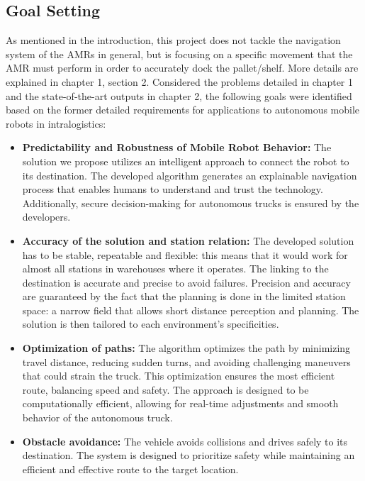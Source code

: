 \subsection{Goal Setting}
As mentioned in the introduction, this project does not tackle the navigation system of the AMRs in 
general, but is focusing on a specific movement that the AMR must perform in order to accurately dock the pallet/shelf. 
More details are explained in chapter 1, section 2.
Considered the problems detailed in chapter 1 and the state-of-the-art outputs in chapter 2, 
the following goals were identified 
based on the former detailed requirements for applications to autonomous mobile robots in intralogistics:
\begin{itemize}
    \item \textbf{Predictability and Robustness of Mobile Robot Behavior: }The solution we propose utilizes an intelligent approach to connect 
    the robot to its destination. The developed algorithm generates an explainable navigation process that enables humans 
    to understand and trust the technology. Additionally, secure decision-making for autonomous trucks is ensured by the 
    developers. 

    \item \textbf{Accuracy of the solution and station relation: }The developed solution has to be stable, repeatable and flexible: this 
    means that it would work for almost all stations in warehouses where it operates. The linking to the destination is 
    accurate and precise to avoid failures. Precision and accuracy are guaranteed by the fact that the planning is done 
    in the limited station space: a narrow field that allows short distance perception and planning. The solution is 
    then tailored to each environment's specificities. 
    
    \item \textbf{Optimization of paths: }The algorithm optimizes the path by minimizing travel distance, reducing sudden turns, and avoiding challenging maneuvers that could 
    strain the truck. This optimization ensures the most efficient route, balancing speed and safety. The approach is designed to be 
    computationally efficient, allowing for real-time adjustments and smooth behavior of the autonomous truck.

    \item \textbf{Obstacle avoidance: }The vehicle avoids collisions and drives safely to its destination. The system is designed to 
    prioritize safety while maintaining an efficient and effective route to the target location.

\end{itemize}


